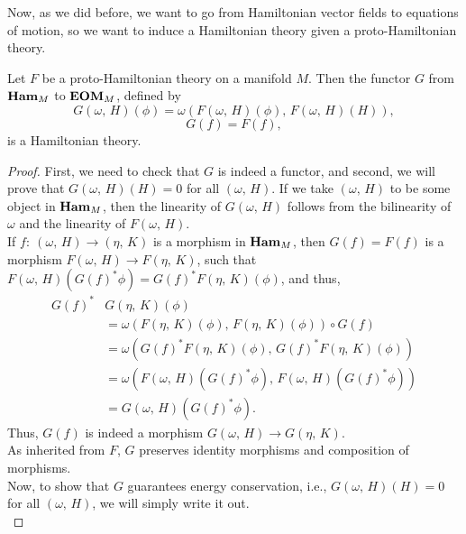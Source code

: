 \documentclass{article}
\newcommand{\category}[1]{{\normalfont\textbf{#1}}}
\begin{document}
\begin{multicols}{2}
	Now, as we did before, we want to go from Hamiltonian vector fields to equations of motion, so we want to induce a Hamiltonian theory given a proto-Hamiltonian theory.
	\begin{lemma}\label{lm:hamiltoniantheory}
		Let \(F\) be a proto-Hamiltonian theory on a manifold \(M\). Then the functor \(G\) from \(\category{Ham}_M\) to \(\category{EOM}_M\), defined by
		\begin{equation}
			G(\omega,\, H)(\phi) = \omega(F(\omega,\, H)(\phi),\, F(\omega,\, H)(H)),
		\end{equation}
		\begin{equation}
			G(f) = F(f),
		\end{equation}
		is a Hamiltonian theory.
	\end{lemma}
	\begin{proof}
		First, we need to check that \(G\) is indeed a functor, and second, we will prove that \(G(\omega,\,H)(H)=0\) for all \((\omega,\,H)\).
		If we take \((\omega,\,H)\) to be some object in \(\category{Ham}_M\), then the linearity of \(G(\omega,\,H)\) follows from the bilinearity of \(\omega\) and the linearity of \(F(\omega,\,H)\).\\
		If \(f:\ (\omega,\,H)\to(\eta,\,K)\) is a morphism in \(\category{Ham}_M\), then \(G(f) = F(f)\) is a morphism \(F(\omega,\,H)\to F(\eta,\,K)\), such that \(F(\omega,\,H)(G(f)^*\phi) = G(f)^*F(\eta,\,K)(\phi)\), and thus,
		\begin{align*}
			G(f)^*&G(\eta,\,K)(\phi) \\
			&= \omega(F(\eta,\,K)(\phi),\,F(\eta,\,K)(\phi))\circ G(f)\\
			&= \omega(G(f)^*F(\eta,\,K)(\phi),\,G(f)^*F(\eta,\,K)(\phi))\\
			&= \omega(F(\omega,\,H)(G(f)^*\phi),\,F(\omega,\,H)(G(f)^*\phi))\\
			&= G(\omega,\,H)(G(f)^*\phi).
		\end{align*}
		Thus, \(G(f)\) is indeed a morphism \(G(\omega,\,H)\to G(\eta,\,K)\).\\
		As inherited from \(F\), \(G\) preserves identity morphisms and composition of morphisms.\\
		Now, to show that \(G\) guarantees energy conservation, i.e., \(G(\omega,\,H)(H)=0\) for all \((\omega,\,H)\), we will simply write it out.
		\begin{equation*}

\end{equation*}
\end{proof}
\end{multicols}
\end{document}
